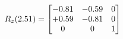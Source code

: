 \documentclass[preview]{standalone}
\begin{document}
\begin{align*}
\special{dvisvgm:raw <g id='unique000'>}R_{z}(2.51) = \begin{bmatrix}-0.81 & -0.59 & 0 \\+0.59 & -0.81 & 0 \\0 & 0 & 1\end{bmatrix}\special{dvisvgm:raw </g>}
\end{align*}
\end{document}
